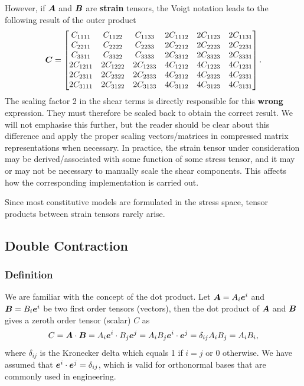 However, if $\bm{A}$ and $\bm{B}$ are \textbf{strain} tensors, the Voigt notation leads to the following result of the outer product
\begin{gather}
\bm{C}=\begin{bmatrix}
C_{1111}&C_{1122}&C_{1133}&2C_{1112}&2C_{1123}&2C_{1131}\\
C_{2211}&C_{2222}&C_{2233}&2C_{2212}&2C_{2223}&2C_{2231}\\
C_{3311}&C_{3322}&C_{3333}&2C_{3312}&2C_{3323}&2C_{3331}\\
2C_{1211}&2C_{1222}&2C_{1233}&4C_{1212}&4C_{1223}&4C_{1231}\\
2C_{2311}&2C_{2322}&2C_{2333}&4C_{2312}&4C_{2323}&4C_{2331}\\
2C_{3111}&2C_{3122}&2C_{3133}&4C_{3112}&4C_{3123}&4C_{3131}
\end{bmatrix}.
\end{gather}
The scaling factor \num{2} in the shear terms is directly responsible for this \textbf{wrong} expression.
They must therefore be scaled back to obtain the correct result.
We will not emphasise this further, but the reader should be clear about this difference and apply the proper scaling vectors/matrices in compressed matrix representations when necessary.
In practice, the strain tensor under consideration may be derived/associated with some function of some stress tensor, and it may or may not be necessary to manually scale the shear components.
This affects how the corresponding implementation is carried out.

Since most constitutive models are formulated in the stress space, tensor products between strain tensors rarely arise.
\subsection{Double Contraction}
\subsubsection{Definition}
We are familiar with the concept of the dot product.
Let $\bm{A}=A_i\bm{e}^i$ and $\bm{B}=B_i\bm{e}^i$ be two first order tensors (vectors), then the dot product of $\bm{A}$ and $\bm{B}$ gives a zeroth order tensor (scalar) $C$ as
\begin{gather}
C=\bm{A}\cdot\bm{B}=A_i\bm{e}^i\cdot{}B_j\bm{e}^j=A_iB_j\bm{e}^i\cdot\bm{e}^j=\delta_{ij}A_iB_j=A_iB_i,
\end{gather}
where $\delta_{ij}$ is the Kronecker delta which equals \num{1} if $i=j$ or \num{0} otherwise.
We have assumed that $\bm{e}^i\cdot\bm{e}^j=\delta_{ij}$, which is valid for orthonormal bases that are commonly used in engineering.

